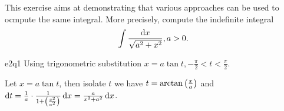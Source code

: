 \documentclass[reqno]{alittlebear}
\begin{document}
\begin{exercise}{}{}
    \begin{note}
        This exercise aims at demonstrating that various approaches can be used to ocmpute the same integral. More precisely, compute the indefinite integral \[\int \frac{\mathop{}\!\mathrm{d} x}{\sqrt{a^2+x^2}}, a>0.\]
    \end{note}
    \begin{question}{}{e2q1}
        Using trigonometric substitution $x=a\tan t,  -\frac\pi2<t<\frac\pi2$.
        \qbreak
        \begin{mathnote}
            Let $x=a\tan t$, then isolate $t$ we have $t=\arctan\left(\frac{x}{a}\right)$ and $\mathop{}\!\mathrm{d} t=\frac1a\cdot\frac{1}{1+\left(\frac{x^2}{a^2}\right)}\mathop{}\!\mathrm{d} x=\frac{a}{x^2+a^2}\mathop{}\!\mathrm{d} x$. 
            \begin{center}
\end{center}
\end{mathnote}
\end{question}
\end{exercise}
\end{document}
